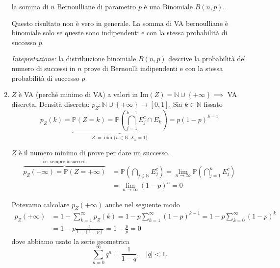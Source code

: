 \begin{enumerate}
la somma di $n$ Bernoulliane di parametro $p$ è una Binomiale $B\left( n,p\right)$.\begin{oss}
Questo risultato non è vero in generale. La somma di VA bernoulliane è binomiale solo se queste sono indipendenti e con la stessa probabilità di successo $p$.
\end{oss}

\textit{Intepretazione:} la distribuzione binomiale $B\left( n,p\right)$ descrive la probabilità del numero di successi in $n$ prove di Bernoulli indipendenti e con la stessa probabilità di successo $p$.
\item $Z$ è VA (perché minimo di VA) a valori in $\mathrm{Im}\left( Z\right) =\mathbb{N} \cup \left\{+\infty \right\} \implies $ VA discreta. Densità discreta: $p_{Z} :\mathbb{N} \cup \left\{+\infty \right\}\rightarrow \left[ 0,1\right]$. Sia $k\in \mathbb{N}$ fissato\begin{equation*}
p_{Z}( k) =\underbrace{\mathbb{P}( Z=k) =\mathbb{P}\left(\bigcap\limits _{j=1}^{k-1} E_{j}^{c} \cap E_{k}\right)}_{Z:=\min\{n\in \mathbb{N} :X_{n} =1\}} =p( 1-p)^{k-1}
\end{equation*}

$Z$ è il numero minimo di prove per dare un successo.\begin{equation*}
\begin{aligned}
\overbrace{p_{Z}( +\infty ) =\mathbb{P}( Z=+\infty )}^{\text{i.e. sempre insuccessi}} & =\mathbb{P}\left(\bigcap _{j\in \mathbb{N}} E_{j}^{c}\right) =\lim _{n\rightarrow \infty }\mathbb{P}\left(\bigcap _{j=1}^{n} E_{j}^{c}\right)\\
 & =\lim _{n\rightarrow \infty }( 1-p)^{n} =0
\end{aligned}
\end{equation*}

\begin{oss}
Potevamo calcolare $p_{Z}( +\infty )$ anche nel seguente modo
\begin{equation*}
\begin{aligned}
p_{Z}( +\infty ) & =1-\sum\limits _{k=1}^{\infty } p_{Z}( k) =1-p\sum\limits _{k=1}^{\infty }( 1-p)^{k-1} =1-p\sum\limits _{k=0}^{\infty }( 1-p)^{k}\\
 & =1-p\frac{1}{1-( 1-p)} =1-\frac{p}{p} =0
\end{aligned}
\end{equation*}
dove abbiamo usato la serie geometrica
\begin{equation*}
\sum\limits _{n=0}^{\infty } q^{n} =\frac{1}{1-q} ,\ \ \ \ | q| < 1.
\end{equation*}
\end{oss}


\end{enumerate}
